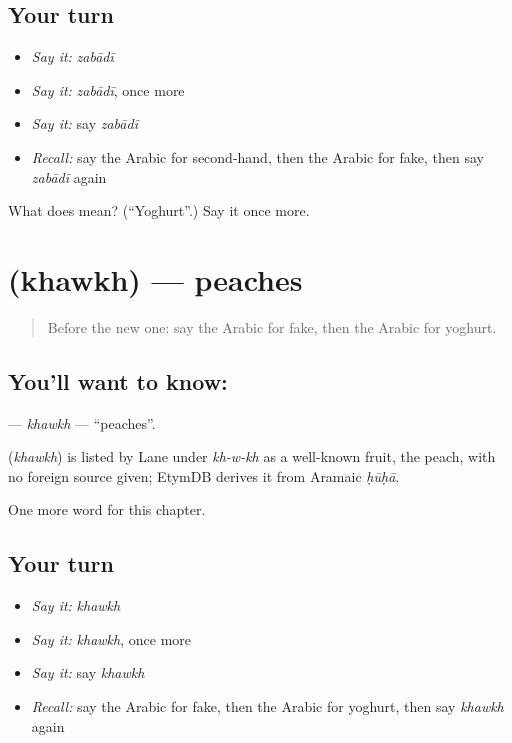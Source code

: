\subsection*{Your turn}
\begin{itemize}
\raggedright
  \item \emph{Say it:} \emph{zabādī}
  \item \emph{Say it:} \emph{zabādī}, once more
  \item \emph{Say it:} say \emph{zabādī}
  \item \emph{Recall:} say the Arabic for second-hand, then the Arabic for fake, then say \emph{zabādī} again
\end{itemize}

\begin{tcolorbox}[breakable,colback=teal!4,colframe=teal!35!black,title={Before you move on}]
What does  mean? (\textquotedblleft{}Yoghurt\textquotedblright{}.) Say it once more.
\end{tcolorbox}
\section[\texorpdfstring{\ar{خوخ} (khawkh)}{خوخ (khawkh)}]{ (khawkh) — peaches}

\label{lesson:AR-C244-khawkh}



\begin{quote}
Before the new one: say the Arabic for fake, then the Arabic for yoghurt.
\end{quote}

\subsection*{You'll want to know: }
\textbf{} — \emph{khawkh} — \textquotedblleft{}peaches\textquotedblright{}.

\begin{cousinweb}
\textbf{} (\emph{khawkh}) is listed by Lane under \emph{kh-w-kh} as a well-known fruit, the peach, with no foreign source given; EtymDB derives it from Aramaic \emph{ḥūḥā}.
\end{cousinweb}

\begin{grammarlens}[title={What you've built}]
One more word for this chapter.
\end{grammarlens}

\subsection*{Your turn}
\begin{itemize}
\raggedright
  \item \emph{Say it:} \emph{khawkh}
  \item \emph{Say it:} \emph{khawkh}, once more
  \item \emph{Say it:} say \emph{khawkh}
  \item \emph{Recall:} say the Arabic for fake, then the Arabic for yoghurt, then say \emph{khawkh} again
\end{itemize}

